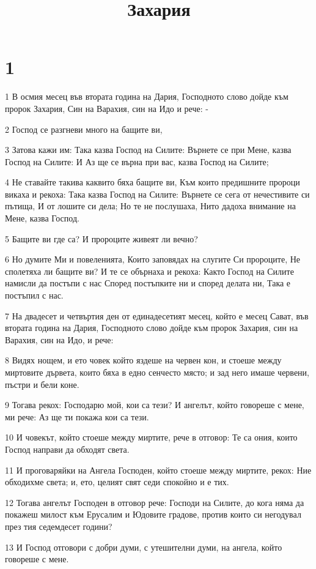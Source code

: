 

\title{Захария}


\chapter{1}

\par 1 В осмия месец във втората година на Дария, Господното слово дойде към пророк Захария, Син на Варахия, син на Идо и рече: -
\par 2 Господ се разгневи много на бащите ви,
\par 3 Затова кажи им: Така казва Господ на Силите: Върнете се при Мене, казва Господ на Силите: И Аз ще се върна при вас, казва Господ на Силите;
\par 4 Не ставайте такива каквито бяха бащите ви, Към които предишните пророци викаха и рекоха: Така казва Господ на Силите: Върнете се сега от нечестивите си пътища, И от лошите си дела; Но те не послушаха, Нито дадоха внимание на Мене, казва Господ.
\par 5 Бащите ви где са? И пророците живеят ли вечно?
\par 6 Но думите Ми и повеленията, Които заповядах на слугите Си пророците, Не сполетяха ли бащите ви? И те се обърнаха и рекоха: Както Господ на Силите намисли да постъпи с нас Според постъпките ни и според делата ни, Така е постъпил с нас.
\par 7 На двадесет и четвъртия ден от единадесетият месец, който е месец Сават, във втората година на Дария, Господното слово дойде към пророк Захария, син на Варахия, син на Идо, и рече:
\par 8 Видях нощем, и ето човек който яздеше на червен кон, и стоеше между миртовите дървета, които бяха в едно сенчесто място; и зад него имаше червени, пъстри и бели коне.
\par 9 Тогава рекох: Господарю мой, кои са тези? И ангелът, който говореше с мене, ми рече: Аз ще ти покажа кои са тези.
\par 10 И човекът, който стоеше между миртите, рече в отговор: Те са ония, които Господ направи да обходят света.
\par 11 И проговаряйки на Ангела Господен, който стоеше между миртите, рекох: Ние обходихме света; и, ето, целият свят седи спокойно и е тих.
\par 12 Тогава ангелът Господен в отговор рече: Господи на Силите, до кога няма да покажеш милост към Ерусалим и Юдовите градове, против които си негодувал през тия седемдесет години?
\par 13 И Господ отговори с добри думи, с утешителни думи, на ангела, който говореше с мене.
